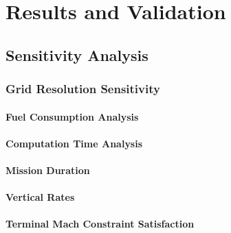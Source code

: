 \documentclass[12pt, a4paper]{report}
\begin{document}
\chapter{Results and Validation}
\label{chap:Results}
 
 


\section{Sensitivity Analysis}


\subsection{Grid Resolution Sensitivity}



\subsubsection{Fuel Consumption Analysis}
\label{sec:FuelConsumptionAnalysis}



\subsubsection{Computation Time Analysis}



\subsubsection{Mission Duration}



\subsubsection{Vertical Rates}




\subsubsection{Terminal Mach Constraint Satisfaction}

\end{document}
